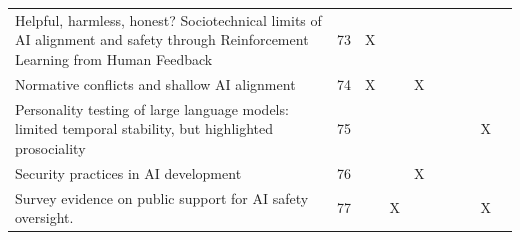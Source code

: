 \begin{landscape}
\begin{longtable}{|p{14cm}|c|c|c|c|c|c|c|c|c|}
		Helpful, harmless, honest? Sociotechnical limits of AI alignment and safety through Reinforcement Learning from Human Feedback                          & 73          & X                                  &                                                           &                                                       &                                                            &                                           &                                              &                                                    &                                    \\
		Normative conflicts and shallow AI alignment                                                                                                            & 74          & X                                  &                                                           & X                                                     &                                                            &                                           &                                              &                                                    &                                    \\
		Personality testing of large language models: limited temporal stability, but highlighted prosociality                                                  & 75          &                                    &                                                           &                                                       &                                                            &                                           &                                              & X                                                  &                                    \\
		Security practices in AI development                                                                                                                    & 76          &                                    &                                                           & X                                                     &                                                            &                                           &                                              &                                                    &                                    \\
		Survey evidence on public support for AI safety oversight.                                                                                              & 77          &                                    & X                                                         &                                                       &                                                            &                                           &                                              & X                                                  &                                    \\

\end{longtable}
\end{landscape}
